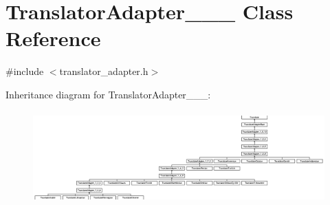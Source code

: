 \hypertarget{class_translator_adapter__1__8__0}{}\section{Translator\+Adapter\+\_\+\_\+\_ Class Reference}
\label{class_translator_adapter__1__8__0}


{\ttfamily \#include $<$translator\+\_\+adapter.\+h$>$}

Inheritance diagram for Translator\+Adapter\+\_\+\_\+\_\+:\begin{figure}[H]
\begin{center}
\leavevmode
\includegraphics[height=3.572567cm]{class_translator_adapter__1__8__0}
\end{center}
\end{figure}
